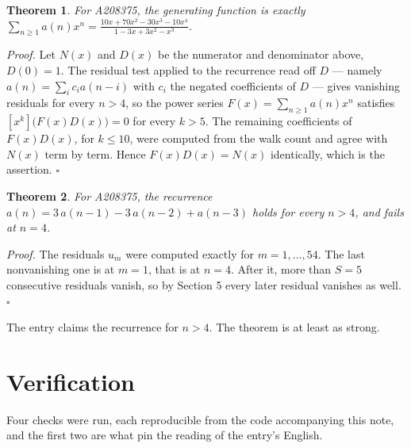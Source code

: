 \documentclass[11pt]{article}
\newtheorem{theorem}{Theorem}
\theoremstyle{definition}
\begin{document}
\begin{theorem} For A208375, the generating function is exactly $\sum_{n\ge 1} a(n)x^n = \frac{10x + 70x^{2} - 30x^{3} - 10x^{4}}{1 - 3x + 3x^{2} - x^{3}}$.\end{theorem}

{\itshape Proof.} Let $N(x)$ and $D(x)$ be the numerator and denominator above, $D(0)=1$. The residual test applied to the recurrence read off $D$ --- namely $a(n) = \sum_i c_i a(n-i)$ with $c_i$ the negated coefficients of $D$ --- gives vanishing residuals for every $n > 4$, so the power series $F(x)=\sum_{n\ge 1}a(n)x^n$ satisfies $[x^k]\bigl(F(x)D(x)\bigr) = 0$ for every $k > 5$. The remaining coefficients of $F(x)D(x)$, for $k \le 10$, were computed from the walk count and agree with $N(x)$ term by term. Hence $F(x)D(x) = N(x)$ identically, which is the assertion. $\square$

\begin{theorem} For A208375, the recurrence $a(n) = 3\,a(n-1) - 3\,a(n-2) + a(n-3)$ holds for every $n > 4$, and fails at $n = 4$.\end{theorem}

{\itshape Proof.} The residuals $u_m$ were computed exactly for $m = 1,\dots,54$. The last nonvanishing one is at $m = 1$, that is at $n = 4$. After it, more than $S = 5$ consecutive residuals vanish, so by Section 5 every later residual vanishes as well. $\square$

The entry claims the recurrence for $n > 4$. The theorem is at least as strong.

\section{Verification}

Four checks were run, each reproducible from the code accompanying this note, and the first two are what pin the reading of the entry's English.
\end{document}
